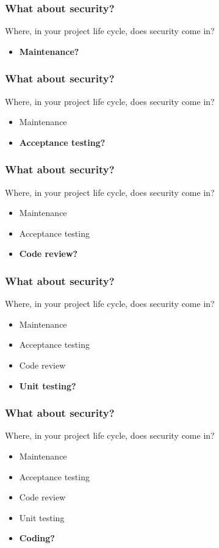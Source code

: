 \documentclass[10pt]{beamer}
\begin{document}
\begin{frame}
	\frametitle{What about security?}

	Where, in your project life cycle, does security come in?

	\begin{itemize}
		\item \textbf{Maintenance?}
	\end{itemize}
\end{frame}
\begin{frame}
	\frametitle{What about security?}

	Where, in your project life cycle, does security come in?

	\begin{itemize}
		\item Maintenance
		\item \textbf{Acceptance testing?}
	\end{itemize}
\end{frame}
\begin{frame}
	\frametitle{What about security?}

	Where, in your project life cycle, does security come in?

	\begin{itemize}
		\item Maintenance
		\item Acceptance testing
		\item \textbf{Code review?}
	\end{itemize}
\end{frame}
\begin{frame}
	\frametitle{What about security?}

	Where, in your project life cycle, does security come in?

	\begin{itemize}
		\item Maintenance
		\item Acceptance testing
		\item Code review
		\item \textbf{Unit testing?}
	\end{itemize}
\end{frame}
\begin{frame}
	\frametitle{What about security?}

	Where, in your project life cycle, does security come in?

	\begin{itemize}
		\item Maintenance
		\item Acceptance testing
		\item Code review
		\item Unit testing
		\item \textbf{Coding?}
	\end{itemize}
\end{frame}
\end{document}
